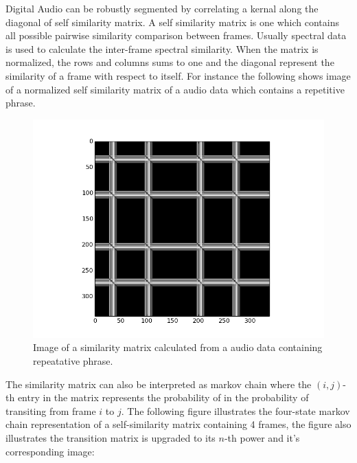 Digital Audio can be robustly segmented by correlating a kernal along the diagonal of self similarity matrix. A self similarity matrix is one which contains all possible pairwise similarity comparison between frames. Usually spectral data is used to calculate the inter-frame spectral similarity. When the matrix is normalized, the rows and columns sums to one and the diagonal represent the similarity of a frame with respect to itself. For instance the following shows image of a normalized self similarity matrix of a audio data which contains a repetitive phrase.
\begin{figure}[h]
\centering
\includegraphics[scale=0.5]{Figures/self_similarity_1.png}
\decoRule
\caption[hypercube]{Image of a similarity matrix calculated from a audio data containing repeatative phrase.}
\label{fig:self_similarity}
\end{figure}

The similarity matrix can also be interpreted as markov chain where the $(i,j)$-th entry in the matrix represents the probability of  in the probability of transiting from frame $i$ to $j$. The following figure illustrates the four-state markov chain representation of a self-similarity matrix containing 4 frames, the figure also illustrates the transition matrix is upgraded to its $n$-th power and it's corresponding image:

